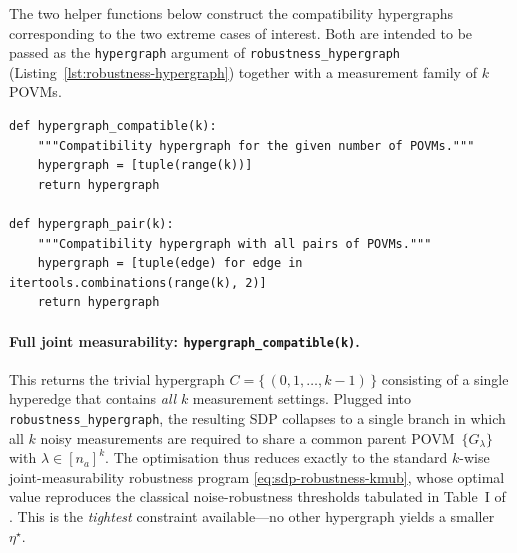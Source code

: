\documentclass[oneside, a4paper, onecolumn, 11pt]{article}
\theoremstyle{definition}
\theoremstyle{plain}
\theoremstyle{remark}
\begin{document}
The two helper functions below construct the compatibility hypergraphs
corresponding to the two extreme cases of interest. Both are intended to
be passed as the \texttt{hypergraph} argument of
\texttt{robustness\_hypergraph} (Listing~\ref{lst:robustness-hypergraph})
together with a measurement family of $k$ POVMs.

\begin{lstlisting}[style=python,
                   caption={Helpers for the two extremal compatibility hypergraphs.},
                   label=lst:hypergraph-helpers]
def hypergraph_compatible(k):
    """Compatibility hypergraph for the given number of POVMs."""
    hypergraph = [tuple(range(k))]
    return hypergraph

def hypergraph_pair(k):
    """Compatibility hypergraph with all pairs of POVMs."""
    hypergraph = [tuple(edge) for edge in itertools.combinations(range(k), 2)]
    return hypergraph
\end{lstlisting}

\paragraph{Full joint measurability:
\texttt{hypergraph\_compatible(k)}.}
This returns the trivial hypergraph
$C = \{\,(0, 1, \dots, k-1)\,\}$ consisting of a single hyperedge that
contains \emph{all} $k$ measurement settings. Plugged into
\texttt{robustness\_hypergraph}, the resulting SDP collapses to a single
branch in which all $k$ noisy measurements are required to share a
common parent POVM~$\{G_\lambda\}$ with
$\lambda \in [n_a]^k$. The optimisation thus reduces exactly to the
standard $k$-wise joint-measurability robustness program
\eqref{eq:sdp-robustness-kmub}, whose optimal value reproduces the
classical noise-robustness thresholds tabulated in Table~I of
\cite{Designolle2019}. This is the \emph{tightest} constraint
available---no other hypergraph yields a smaller~$\eta^{\star}$.
\end{document}
